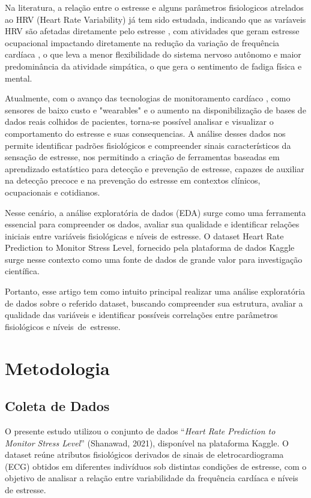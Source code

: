 \documentclass[conference]{IEEEtran}
\begin{document}
Na literatura, a relação entre o estresse e alguns parâmetros fisiologicos atrelados ao HRV (Heart Rate Variability) já tem sido estudada, indicando que
as varíaveis HRV são afetadas diretamente pelo estresse \cite{b1}, com atividades que geram estresse ocupacional impactando diretamente na redução da variação de frequência
cardíaca \cite{b2}, o que leva a menor flexibilidade do sistema nervoso autônomo e maior predominância da atividade simpática, o que gera o sentimento de fadiga física e mental.

Atualmente, com o avanço das tecnologias de monitoramento cardíaco \cite{b3}, como sensores de baixo custo e "wearables" e o aumento na disponibilização de bases de dados reais colhidos de pacientes, torna-se possível
analisar e visualizar o comportamento do estresse e suas consequencias. A análise desses dados nos permite identificar padrões fisiológicos e compreender sinais característicos 
da sensação de estresse, nos permitindo a criação de ferramentas baseadas em aprendizado estatístico para detecção e prevenção de estresse, capazes de auxiliar na detecção precoce e na prevenção 
do estresse em contextos clínicos, ocupacionais e cotidianos.

Nesse cenário, a análise exploratória de dados (EDA) surge como uma ferramenta essencial para compreender os dados, avaliar sua qualidade e identificar relações iniciais entre variáveis fisiológicas e 
níveis de estresse. O dataset Heart Rate Prediction to Monitor Stress Level, fornecido pela plataforma de dados Kaggle surge nesse contexto como uma fonte de dados
de grande valor para investigação científica.

Portanto, esse artigo tem como intuito principal realizar uma análise exploratória de dados sobre o referido dataset, buscando compreender sua estrutura, 
avaliar a qualidade das variáveis e identificar possíveis correlações entre parâmetros fisiológicos e níveis de estresse.

\section{Metodologia}

\subsection{Coleta de Dados}

O presente estudo utilizou o conjunto de dados “\textit{Heart Rate Prediction to Monitor Stress Level}” (Shanawad, 2021), disponível na plataforma Kaggle. O dataset reúne atributos fisiológicos derivados de sinais de eletrocardiograma (ECG) obtidos em diferentes indivíduos sob distintas condições de estresse, com o objetivo de analisar a relação entre variabilidade da frequência cardíaca e níveis de estresse.
\end{document}

